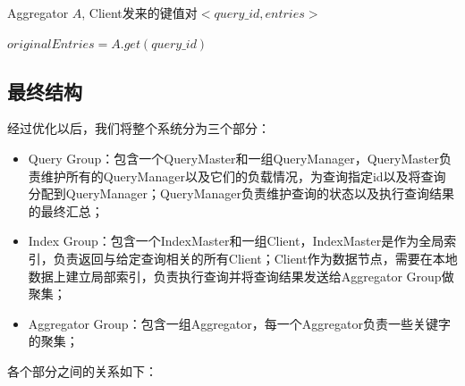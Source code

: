 \documentclass{elegantpaper}
\begin{document}
\begin{algorithm}

    \begin{algorithmic}[1]

        \Require Aggregator $A$, Client发来的键值对$<query\_id, entries>$

                \State $originalEntries = A.get(query\_id)$
                    \Else
                    \EndIf
                \EndFor
            \Else
            \EndIf
        \EndFunction
        
    \end{algorithmic}
    
\end{algorithm}

\subsection{最终结构}

经过优化以后，我们将整个系统分为三个部分：

\begin{itemize}

    \item Query Group：包含一个QueryMaster和一组QueryManager，QueryMaster负责维护所有的QueryManager以及它们的负载情况，为查询指定id以及将查询分配到QueryManager；QueryManager负责维护查询的状态以及执行查询结果的最终汇总；

    \item Index Group：包含一个IndexMaster和一组Client，IndexMaster是作为全局索引，负责返回与给定查询相关的所有Client；Client作为数据节点，需要在本地数据上建立局部索引，负责执行查询并将查询结果发送给Aggregator Group做聚集；
    
    \item Aggregator Group：包含一组Aggregator，每一个Aggregator负责一些关键字的聚集；
    
\end{itemize}

\noindent 各个部分之间的关系如下：\\\\\\\\
\end{document}
